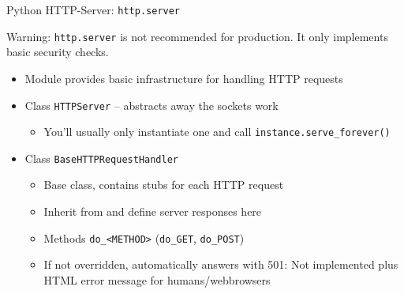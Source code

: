 \begin{frame}{Python HTTP-Server: \texttt{http.server}}
%
\begin{warnbox}
\footnotesize
Warning: \texttt{http.server} is not recommended for production. It only implements basic security checks.
\end{warnbox}
%
\begin{itemize}
\item Module provides basic infrastructure for handling HTTP requests
\item Class \texttt{HTTPServer} -- abstracts away the sockets work
	\begin{itemize}
	\item You'll usually only instantiate one and call \texttt{instance.serve\_forever()}
	\end{itemize}
\item Class \texttt{BaseHTTPRequestHandler}
	\begin{itemize}
	\item Base class, contains stubs for each HTTP request
	\item Inherit from and define server responses here
	\item Methods \texttt{do\_<METHOD>} (\zB \texttt{do\_GET}, \texttt{do\_POST})
	\item If not overridden, automatically answers with 501: Not implemented plus HTML error message for humans/webbrowsers
	\end{itemize}
\end{itemize}
%
\end{frame}


